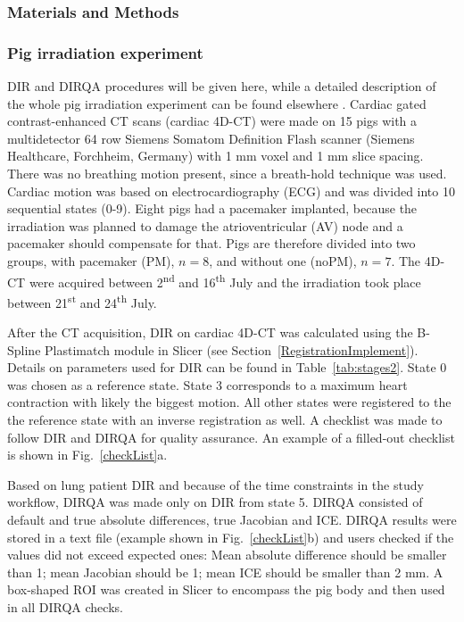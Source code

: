 \subsubsection{Materials and Methods}


\subsubsection{Pig irradiation experiment}

DIR and DIRQA procedures will be given here, while a detailed description of the whole pig irradiation experiment can be found elsewhere \cite{Graeff2014a}. Cardiac gated contrast-enhanced CT scans (cardiac 4D-CT) were made on 15 pigs with a multidetector 64 row Siemens Somatom Definition Flash scanner 
(Siemens Healthcare, Forchheim, Germany) with 1 mm voxel and 1 mm slice spacing. There was no breathing motion present, since a breath-hold technique was used. Cardiac motion was based on electrocardiography (ECG)
and was divided into 10 sequential states (0-9). 
Eight pigs had a pacemaker implanted, because the irradiation was planned to damage the atrioventricular (AV) node and a pacemaker should compensate for that. Pigs are therefore divided into two groups, with pacemaker (PM), $n=8$, and without one (noPM), $n=7$.
The 4D-CT were acquired between 2\textsuperscript{nd} and 16\textsuperscript{th} July and the irradiation took place between 21\textsuperscript{st} and 24\textsuperscript{th} July.

After the CT acquisition, DIR on cardiac 4D-CT was calculated using the B-Spline Plastimatch module in Slicer (see Section~\ref{RegistrationImplement}). 
Details on parameters used for DIR can be found in Table~\ref{tab:stages2}. State 0 was chosen as a reference state. State 3 corresponds to a maximum heart contraction with likely
the biggest motion. All other states were registered to the the reference state with an inverse registration as well. 
A checklist was made to follow DIR and DIRQA for quality assurance. An example of a filled-out checklist is shown in Fig.~\ref{checkList}a.

Based on lung patient DIR and because of the time constraints in the study workflow, DIRQA was made only on DIR from state 5. 
DIRQA consisted of default and true absolute differences, true Jacobian and ICE. DIRQA results were stored in a text file (example shown in Fig.~\ref{checkList}b) and users checked if the values did not exceed expected ones: Mean absolute difference
should be smaller than 1; mean Jacobian  should be 1; mean ICE  should be smaller than 2 mm. A box-shaped ROI was created in Slicer to encompass the pig body and then used in all DIRQA checks.

